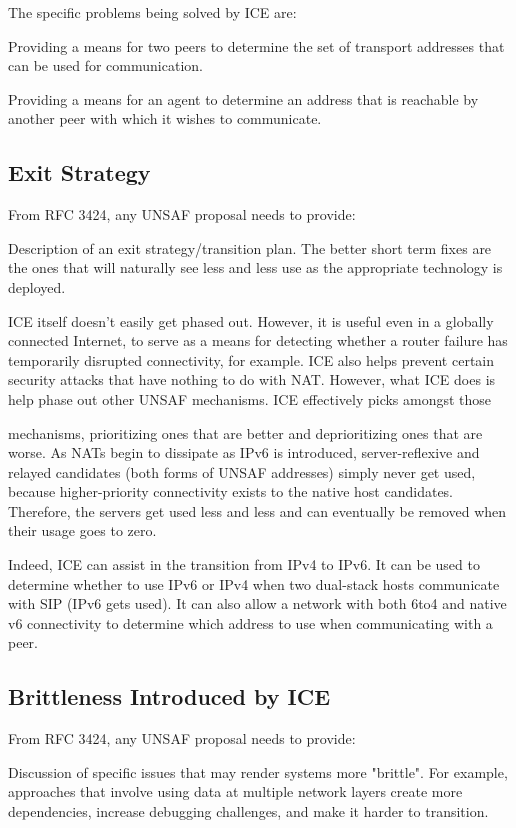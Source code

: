 \documentclass{article}
\begin{document}
The specific problems being solved by ICE are:

Providing a means for two peers to determine the set of transport addresses that can be used for communication.

Providing a means for an agent to determine an address that is reachable by another peer with which it wishes to communicate.

\subsection{Exit Strategy}

From RFC 3424, any UNSAF proposal needs to provide:

Description of an exit strategy/transition plan.  The better short term fixes are the ones that will naturally see less and less use as the appropriate technology is deployed.

ICE itself doesn't easily get phased out.  However, it is useful even in a globally connected Internet, to serve as a means for detecting whether a router failure has temporarily disrupted connectivity, for example.  ICE also helps prevent certain security attacks that have nothing to do with NAT.  However, what ICE does is help phase out other UNSAF mechanisms.  ICE effectively picks amongst those

mechanisms, prioritizing ones that are better and deprioritizing ones that are worse.  As NATs begin to dissipate as IPv6 is introduced, server-reflexive and relayed candidates (both forms of UNSAF addresses) simply never get used, because higher-priority connectivity exists to the native host candidates.  Therefore, the servers get used less and less and can eventually be removed when their usage goes to zero.

Indeed, ICE can assist in the transition from IPv4 to IPv6.  It can be used to determine whether to use IPv6 or IPv4 when two dual-stack hosts communicate with SIP (IPv6 gets used).  It can also allow a network with both 6to4 and native v6 connectivity to determine which address to use when communicating with a peer.

\subsection{Brittleness Introduced by ICE}

From RFC 3424, any UNSAF proposal needs to provide:

Discussion of specific issues that may render systems more "brittle".  For example, approaches that involve using data at multiple network layers create more dependencies, increase debugging challenges, and make it harder to transition.
\end{document}
